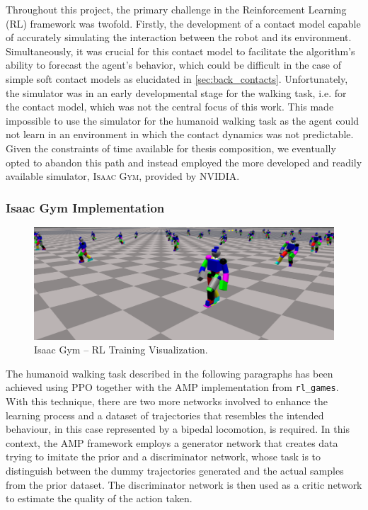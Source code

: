 Throughout this project, the primary challenge in the Reinforcement Learning (\ac{RL}) framework was twofold. Firstly, the development of a contact model capable of accurately simulating the interaction between the robot and its environment. Simultaneously, it was crucial for this contact model to facilitate the algorithm's ability to forecast the agent's behavior, which could be difficult in the case of simple soft contact models as elucidated in \cref{sec:back_contacts}. Unfortunately, the \jaxsim simulator was in an early developmental stage for the walking task, i.e. for the contact model, which was not the central focus of this work. This made impossible to use the \jaxsim simulator for the humanoid walking task as the agent could not learn in an environment in which the contact dynamics was not predictable. Given the constraints of time available for thesis composition, we eventually opted to abandon this path and instead employed the more developed and readily available simulator, \textsc{Isaac Gym}, provided by NVIDIA.

\subsubsection{Isaac Gym Implementation}

\begin{figure}
    \centering
    \caption{Isaac Gym -- RL Training Visualization.}
    \label{fig:isaacgymtraining}
    \includegraphics[width=.9\textwidth]{Images/stickbot_training_1.png}
\end{figure}

The humanoid walking task described in the following paragraphs has been achieved using \ac{PPO} together with the \ac{AMP} implementation from \texttt{rl\_games}. With this technique, there are two more networks involved to enhance the learning process and a dataset of trajectories that resembles the intended behaviour, in this case represented by a bipedal locomotion, is required. In this context, the AMP framework employs a generator network that creates data trying to imitate the prior and a discriminator network, whose task is to distinguish between the dummy trajectories generated and the actual samples from the prior dataset. The discriminator network is then used as a critic network to estimate the quality of the action taken.

